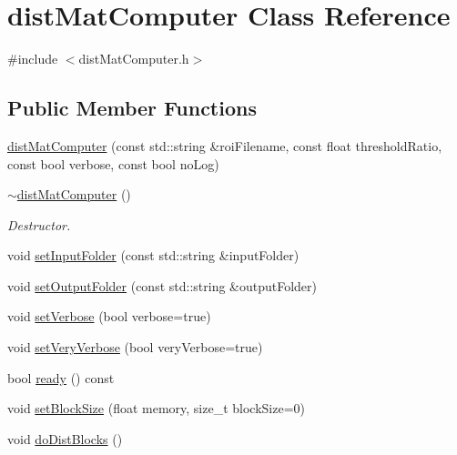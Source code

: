 \hypertarget{classdistMatComputer}{\section{dist\-Mat\-Computer \-Class \-Reference}
\label{classdistMatComputer}
}


{\ttfamily \#include $<$dist\-Mat\-Computer.\-h$>$}

\subsection*{\-Public \-Member \-Functions}
\begin{DoxyCompactItemize}
\item 
\hyperlink{classdistMatComputer_af47f2049b738d55b15292d1cd7759266}{dist\-Mat\-Computer} (const std\-::string \&roi\-Filename, const float threshold\-Ratio, const bool verbose, const bool no\-Log)
\item 
\hypertarget{classdistMatComputer_a4b82a46e53e59f31cfa99937853e4dd5}{\hyperlink{classdistMatComputer_a4b82a46e53e59f31cfa99937853e4dd5}{$\sim$dist\-Mat\-Computer} ()}\label{classdistMatComputer_a4b82a46e53e59f31cfa99937853e4dd5}

\begin{DoxyCompactList}\small\item\em \-Destructor. \end{DoxyCompactList}\item 
void \hyperlink{classdistMatComputer_a3eda189c29b6a4b33b7fb79fab285da7}{set\-Input\-Folder} (const std\-::string \&input\-Folder)
\item 
void \hyperlink{classdistMatComputer_a7b057ae664355192ff54f5f1b0c88674}{set\-Output\-Folder} (const std\-::string \&output\-Folder)
\item 
void \hyperlink{classdistMatComputer_ad37c8350132ca868e82650deb26c83c4}{set\-Verbose} (bool verbose=true)
\item 
void \hyperlink{classdistMatComputer_a76d5666d4cc06e25294581909d563274}{set\-Very\-Verbose} (bool very\-Verbose=true)
\item 
bool \hyperlink{classdistMatComputer_ae8cb9613de8d550b5afb19954a219c65}{ready} () const 
\item 
void \hyperlink{classdistMatComputer_ac59ef6082cafa97fcc329143ca76a713}{set\-Block\-Size} (float memory, size\-\_\-t block\-Size=0)
\item 
void \hyperlink{classdistMatComputer_a33aff7e2ad324c0a59b3302a929a6e5f}{do\-Dist\-Blocks} ()
\end{DoxyCompactItemize}


